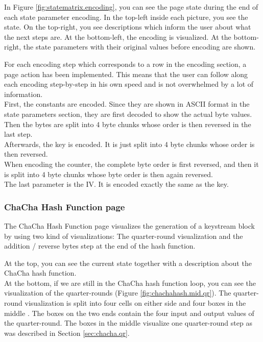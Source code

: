 In Figure \ref{fig:statematrix.encoding}, you can see the page state during the end of each state parameter encoding. In the top-left inside each picture, you see the state. On the top-right, you see descriptions which inform the user about what the next steps are. At the bottom-left, the encoding is visualized. At the bottom-right, the state parameters with their original values before encoding are shown.

For each encoding step which corresponds to a row in the encoding section, a page action has been implemented. This means that the user can follow along each encoding step-by-step in his own speed and is not overwhelmed by a lot of information.\\
First, the constants are encoded. Since they are shown in ASCII format in the state parameters section, they are first decoded to show the actual byte values. Then the bytes are split into 4 byte chunks whose order is then reversed in the last step. \\
Afterwards, the key is encoded. It is just split into 4 byte chunks whose order is then reversed. \\
When encoding the counter, the complete byte order is first reversed, and then it is split into 4 byte chunks whose byte order is then again reversed. \\
The last parameter is the IV. It is encoded exactly the same as the key. \\

\subsubsection{ChaCha Hash Function page}

The ChaCha Hash Function page visualizes the generation of a keystream block by using two kind of visualizations: The quarter-round visualization  and the addition / reverse bytes step at the end of the hash function.

At the top, you can see the current state together with a description about the ChaCha hash function.\\
At the bottom, if we are still in the ChaCha hash function loop, you can see the visualization of the quarter-rounds (Figure \ref{fig:chachahash.mid.qr}). The quarter-round visualization is split into four cells on either side and four boxes in the middle . The boxes on the two ends contain the four input and output values of the quarter-round. The boxes in the middle visualize one quarter-round step as was described in Section \ref{sec:chacha.qr}.

